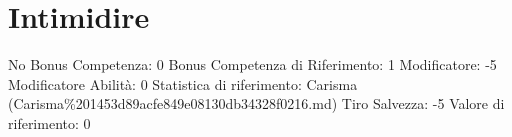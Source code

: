 \section{Intimidire}\label{intimidire}

\begin{description}
\tightlist
\item[Tags: ABI]
No Bonus Competenza: 0 Bonus Competenza di Riferimento: 1 Modificatore:
-5 Modificatore Abilità: 0 Statistica di riferimento: Carisma
(Carisma\%201453d89acfe849e08130db34328f0216.md) Tiro Salvezza: -5
Valore di riferimento: 0
\end{description}
